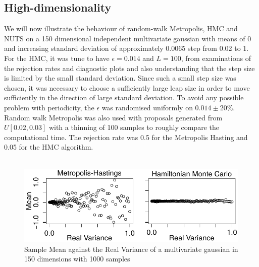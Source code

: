 \documentclass[11pt]{article}
\begin{document}
\subsection{High-dimensionality}
We will now illustrate the behaviour of random-walk Metropolis, HMC and NUTS on a 150 dimensional independent multivariate gaussian with means of 0 and increasing standard deviation of approximately 0.0065 step from 0.02 to 1. For the HMC, it was tune to have $\epsilon = 0.014$ and $L=100$, from examinations of the rejection rates and diagnostic plots and also understanding that the step size is limited by the small standard deviation. Since such a small step size was chosen, it was necessary to choose a sufficiently large leap size in order to move sufficiently in the direction of large standard deviation. To avoid any possible problem with periodicity, the $\epsilon$ was randomised uniformly on $0.014 \pm 20 \%$. Random walk Metropolis was also used with proposals generated from $U[0.02,0.03]$ with a thinning of 100 samples to roughly compare the computational time. The rejection rate was 0.5 for the Metropolis Hasting and 0.05 for the HMC algorithm. 
\\
\\
\begin{figure}[H]
\center
  \includegraphics[width=5in]{images/MHvsHM_var.pdf}
  \caption{Sample Mean against the Real Variance of a multivariate gaussian in 150 dimensions with 1000 samples}
\end{figure}
\end{document}
